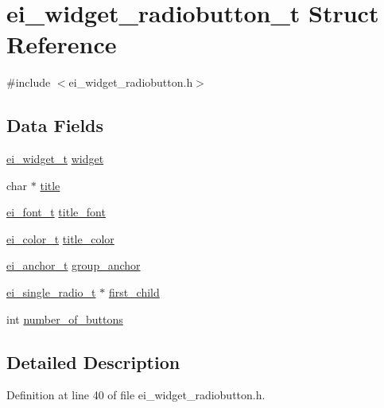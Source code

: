 \hypertarget{structei__widget__radiobutton__t}{\section{ei\-\_\-widget\-\_\-radiobutton\-\_\-t Struct Reference}
\label{structei__widget__radiobutton__t}
}


{\ttfamily \#include $<$ei\-\_\-widget\-\_\-radiobutton.\-h$>$}

\subsection*{Data Fields}
\begin{DoxyCompactItemize}
\item 
\hyperlink{structei__widget__t}{ei\-\_\-widget\-\_\-t} \hyperlink{structei__widget__radiobutton__t_a0a43ac1f993d211be2c618c2f0ee101a}{widget}
\item 
char $\ast$ \hyperlink{structei__widget__radiobutton__t_a5fefe99675a2884417a20383885ea5a6}{title}
\item 
\hyperlink{ei__types_8h_a22c8198e4d641e4bc67bb17f9c6bcda7}{ei\-\_\-font\-\_\-t} \hyperlink{structei__widget__radiobutton__t_a2494261ae892b7666846498bbe0ad461}{title\-\_\-font}
\item 
\hyperlink{structei__color__t}{ei\-\_\-color\-\_\-t} \hyperlink{structei__widget__radiobutton__t_ae10f422aa713c064b39094476f804cc6}{title\-\_\-color}
\item 
\hyperlink{ei__types_8h_a3852c963af609d31d7cfcff79c4c8450}{ei\-\_\-anchor\-\_\-t} \hyperlink{structei__widget__radiobutton__t_a115a17bdb5ddbaabc17bab9c562869c5}{group\-\_\-anchor}
\item 
\hyperlink{structei__single__radio__t}{ei\-\_\-single\-\_\-radio\-\_\-t} $\ast$ \hyperlink{structei__widget__radiobutton__t_a3f0ddebff6ebeace0664fb069b2bed57}{first\-\_\-child}
\item 
int \hyperlink{structei__widget__radiobutton__t_a33208c02fd6243e13d748a024d7ba337}{number\-\_\-of\-\_\-buttons}
\end{DoxyCompactItemize}


\subsection{Detailed Description}


Definition at line 40 of file ei\-\_\-widget\-\_\-radiobutton.\-h.



